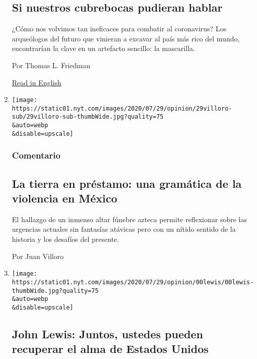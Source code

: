 \begin{enumerate}
  \hypertarget{si-nuestros-cubrebocas-pudieran-hablar}{%
  \subsection{Si nuestros cubrebocas pudieran
  hablar}\label{si-nuestros-cubrebocas-pudieran-hablar}}

  ¿Cómo nos volvimos tan ineficaces para combatir al coronavirus? Los
  arqueólogos del futuro que vinieran a excavar al país más rico del
  mundo, encontrarían la clave en un artefacto sencillo: la mascarilla.

  Por Thomas L. Friedman

  \href{https://www.nytimes.com/2020/07/28/opinion/coronavirus-masks.html}{Read
  in English}
\item
  \href{/es/2020/07/30/espanol/opinion/aztecas-violencia-narco-amlo.html}{}

  \texttt{[image: https://static01.nyt.com/images/2020/07/29/opinion/29villoro-sub/29villoro-sub-thumbWide.jpg?quality=75\\\&auto=webp\\\&disable=upscale]}

  \hypertarget{comentario-8}{%
  \subsubsection{Comentario}\label{comentario-8}}

  \hypertarget{la-tierra-en-pruxe9stamo-una-gramuxe1tica-de-la-violencia-en-muxe9xico}{%
  \subsection{La tierra en préstamo: una gramática de la violencia en
  México}\label{la-tierra-en-pruxe9stamo-una-gramuxe1tica-de-la-violencia-en-muxe9xico}}

  El hallazgo de un inmenso altar fúnebre azteca permite reflexionar
  sobre las urgencias actuales sin fantasías atávicas pero con un nítido
  sentido de la historia y los desafíos del presente.

  Por Juan Villoro
\item
  \href{/es/2020/07/30/espanol/opinion/john-lewis-derechos-civiles.html}{}

  \texttt{[image: https://static01.nyt.com/images/2020/07/29/opinion/00lewis/00lewis-thumbWide.jpg?quality=75\\\&auto=webp\\\&disable=upscale]}

  \hypertarget{john-lewis-juntos-ustedes-pueden-recuperar-el-alma-de-estados-unidos}{%
  \subsection{John Lewis: Juntos, ustedes pueden recuperar el alma de
  Estados
  Unidos}\label{john-lewis-juntos-ustedes-pueden-recuperar-el-alma-de-estados-unidos}}


\end{enumerate}

